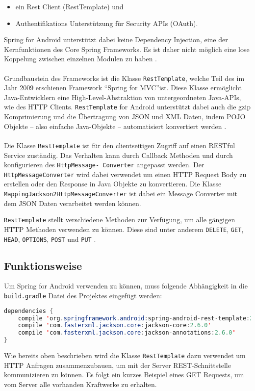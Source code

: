 \begin{itemize}
	\item ein Rest Client (RestTemplate) und
	\item Authentifikations Unterstützung für Security APIs (OAuth).
\end{itemize}

Spring for Android unterstützt dabei keine Dependency Injection, eine der Kernfunktionen des Core Spring Frameworks. Es ist daher nicht möglich eine lose Koppelung zwischen einzelnen Modulen zu haben \cite{springForAndroid:dahanne}.
\\\\
Grundbaustein des Frameworks ist die Klasse \texttt{RestTemplate}, welche Teil des im Jahr 2009 erschienen Framework \textquotedblleft Spring for MVC\textquotedblright ist. Diese Klasse ermöglicht Java-Entwicklern eine High-Level-Abstraktion von untergeordneten Java-APIs, wie des HTTP Clients. \texttt{RestTemplate} for Android unterstützt dabei auch die gzip Komprimierung und die Übertragung von \acrfull{JSON} und \acrfull{XML} Daten, indem \acrfull{POJO} Objekte  – also einfache Java-Objekte – automatisiert konvertiert werden \cite{springForAndroid:dahanne}.
\\\\
Die Klasse \texttt{RestTemplate} ist für den clientseitigen Zugriff auf einen RESTful Service zuständig. Das Verhalten kann durch Callback Methoden und durch konfigurieren des \texttt{HttpMessage- Converter} angepasst werden. Der \texttt{HttpMessageConverter} wird dabei verwendet um einen HTTP Request Body zu erstellen oder den Response in Java Objekte zu konvertieren. Die Klasse \texttt{MappingJackson2HttpMessageConverter} ist dabei ein Message Converter mit dem JSON Daten verarbeitet werden können.

\texttt{RestTemplate} stellt verschiedene Methoden zur Verfügung, um alle gängigen HTTP Methoden verwenden zu können. Diese sind unter anderem \texttt{DELETE}, \texttt{GET}, \texttt{HEAD}, \texttt{OPTIONS}, \texttt{POST} und \texttt{PUT} \cite{springDokuRestTemplate}.

\subsection{Funktionsweise}
Um Spring for Android verwenden zu können, muss folgende Abhängigkeit in die \texttt{build.gradle} Datei des Projektes eingefügt werden:

\begin{lstlisting}[language=java, numbers=none, frame=single, stringstyle=\color{mymauve}\scriptsize]
dependencies {
	compile 'org.springframework.android:spring-android-rest-template:2.0.0.M1'
	compile 'com.fasterxml.jackson.core:jackson-core:2.6.0'
	compile 'com.fasterxml.jackson.core:jackson-annotations:2.6.0'
}
\end{lstlisting}
\newpage
Wie bereits oben beschrieben wird die Klasse \texttt{RestTemplate} dazu verwendet um HTTP Anfragen zusammenzubauen, um mit der Server REST-Schnittstelle kommunizieren zu können. Es folgt ein kurzes Beispiel eines GET Requests, um vom Server alle vorhanden Kraftwerke zu erhalten.

